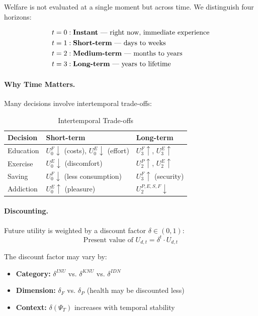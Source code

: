 Welfare is not evaluated at a single moment but across time.
We distinguish four horizons:

\begin{definition}
\label{def:time-horizons}
\begin{align*}
t = 0 &: \text{\textbf{Instant} --- right now, immediate experience} \\
t = 1 &: \text{\textbf{Short-term} --- days to weeks} \\
t = 2 &: \text{\textbf{Medium-term} --- months to years} \\
t = 3 &: \text{\textbf{Long-term} --- years to lifetime}
\end{align*}
\end{definition}

\paragraph{Why Time Matters.}
Many decisions involve intertemporal trade-offs:

\begin{table}[htbp]
\centering
\caption{Intertemporal Trade-offs}
\label{tab:intertemporal}
\renewcommand{\arraystretch}{1.3}
\begin{tabular}{@{}lll@{}}
\toprule
\textbf{Decision} & \textbf{Short-term} & \textbf{Long-term} \\
\midrule
Education & $U^F_0 \downarrow$ (costs), $U^E_0 \downarrow$ (effort) & $U^F_3 \uparrow$, $U^E_3 \uparrow$ \\
Exercise & $U^E_0 \downarrow$ (discomfort) & $U^P_2 \uparrow$, $U^E_2 \uparrow$ \\
Saving & $U^F_0 \downarrow$ (less consumption) & $U^F_3 \uparrow$ (security) \\
Addiction & $U^E_0 \uparrow$ (pleasure) & $U^{P,E,S,F}_2 \downarrow$ \\
\bottomrule
\end{tabular}
\end{table}

\paragraph{Discounting.}
Future utility is weighted by a discount factor $\delta \in (0, 1)$:
\begin{equation}
\text{Present value of } U_{d,t} = \delta^t \cdot U_{d,t}
\end{equation}

The discount factor may vary by:
\begin{itemize}
\item \textbf{Category:} $\delta^{INU}$ vs. $\delta^{KNU}$ vs. $\delta^{IDN}$
\item \textbf{Dimension:} $\delta_F$ vs. $\delta_P$ (health may be discounted less)
\item \textbf{Context:} $\delta(\Psi_T)$ increases with temporal stability
\end{itemize}

